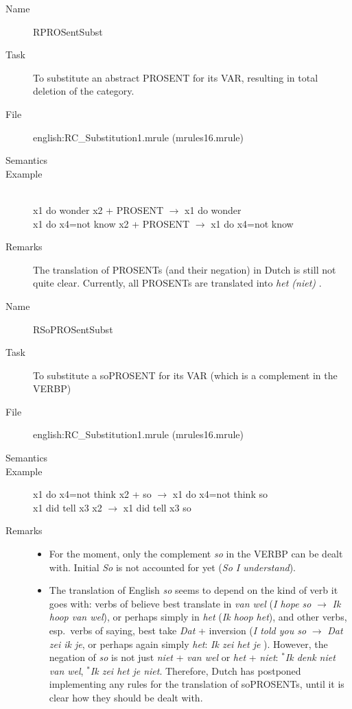 \begin{description}
\vspace{1 cm}
\begin{description}
\item[Name] RPROSentSubst
\item[Task] To substitute an abstract PROSENT for its VAR, resulting in total 
deletion of the category.
\item[File] english:RC\_Substitution1.mrule (mrules16.mrule)
\item[Semantics]
\item[Example] \mbox{}\\
x1 do wonder x2 + PROSENT $\rightarrow$ x1 do wonder\\
x1 do x4=not know x2 + PROSENT $\rightarrow$ x1 do x4=not know 
\item[Remarks] The translation of PROSENTs (and their negation) in Dutch is 
still not quite clear. Currently, all PROSENTs are translated into {\em het 
(niet) \/}.
\end{description}

\vspace{1 cm}
\begin{description}
\item[Name] RSoPROSentSubst
\item[Task] To substitute a soPROSENT for its VAR (which is a complement in the 
VERBP)
\item[File] english:RC\_Substitution1.mrule (mrules16.mrule)
\item[Semantics]
\item[Example] x1 do x4=not think x2 + so $\rightarrow$ x1 do x4=not think so\\
x1 did tell x3 x2 $\rightarrow$ x1 did tell x3 so
\item[Remarks] \mbox{}
\begin{itemize}
\item For the moment, only the complement {\em so\/} in the VERBP can be dealt 
with. Initial {\em So\/} is not accounted for yet ({\em So I understand\/}).
\item The translation of English {\em so\/} seems to depend on the kind of verb 
it goes with: verbs of believe best translate in {\em van wel\/} ({\em I hope 
so\/} $\rightarrow$ {\em Ik hoop van wel\/}), or perhaps simply in {\em het\/} 
({\em Ik hoop het\/}), and other verbs, esp.\ verbs of 
saying, best take {\em Dat\/} + inversion ({\em I told you so\/} $\rightarrow$ 
{\em Dat zei ik je\/}, or perhaps again simply {\em het\/}: {\em Ik zei het je
\/}). However, the negation of {\em so\/} is not just {
\em niet\/} + {\em van wel\/} or {\em het\/} + {\em niet\/}: 
$^{*}${\em Ik denk niet van wel\/}, $^{*}${\em Ik zei het je niet\/}. 
Therefore,
Dutch has postponed implementing any rules for the translation of soPROSENTs, 
until it is clear how they should be dealt with.
\end{itemize}
\end{description}


\end{description}
